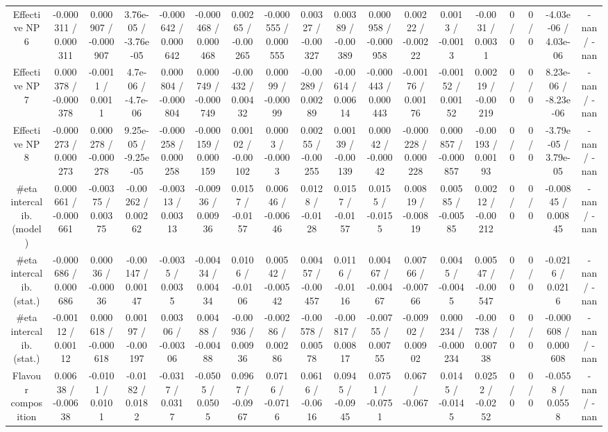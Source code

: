 \documentclass[10pt]{article}
\begin{document}
\begin{table}[htbp]
\begin{center}
\begin{tabular}{|c|c|c|c|c|c|c|c|c|c|c|c|c|c|c|c|c|c|}
  Effective NP 6 & -0.000311 / 0.000311 & 0.000907 / -0.000907 & 3.76e-05 / -3.76e-05 & -0.000642 / 0.000642 & -0.000468 / 0.000468 & 0.00265 / -0.00265 & -0.000555 / 0.000555 & 0.00327 / -0.00327 & 0.00389 / -0.00389 & 0.000958 / -0.000958 & 0.00222 / -0.00222 & 0.0013 / -0.0013 & -0.0031 / 0.0031 & 0 / 0 & 0 / 0 & -4.03e-06 / 4.03e-06 & -nan / -nan \\ 
  Effective NP 7 & 0.000378 / -0.000378 & -0.0011 / 0.0011 & 4.7e-06 / -4.7e-06 & 0.000804 / -0.000804 & 0.000749 / -0.000749 & -0.00432 / 0.00432 & 0.00099 / -0.00099 & -0.00289 / 0.00289 & -0.00614 / 0.00614 & -0.000443 / 0.000443 & -0.00176 / 0.00176 & -0.00152 / 0.00152 & 0.00219 / -0.00219 & 0 / 0 & 0 / 0 & 8.23e-06 / -8.23e-06 & -nan / -nan \\ 
  Effective NP 8 & -0.000273 / 0.000273 & 0.000278 / -0.000278 & 9.25e-05 / -9.25e-05 & -0.000258 / 0.000258 & -0.000159 / 0.000159 & 0.00102 / -0.00102 & 0.0003 / -0.0003 & 0.00255 / -0.00255 & 0.00139 / -0.00139 & 0.00042 / -0.00042 & -0.000228 / 0.000228 & 0.000857 / -0.000857 & -0.00193 / 0.00193 & 0 / 0 & 0 / 0 & -3.79e-05 / 3.79e-05 & -nan / -nan \\ 
  #eta intercalib. (model) & 0.000661 / -0.000661 & -0.00375 / 0.00375 & -0.00262 / 0.00262 & -0.00313 / 0.00313 & -0.00936 / 0.00936 & 0.0157 / -0.0157 & 0.00646 / -0.00646 & 0.0128 / -0.0128 & 0.0157 / -0.0157 & 0.0155 / -0.0155 & 0.00819 / -0.00819 & 0.00585 / -0.00585 & 0.00212 / -0.00212 & 0 / 0 & 0 / 0 & -0.00845 / 0.00845 & -nan / -nan \\ 
  #eta intercalib. (stat.) & -0.000686 / 0.000686 & 0.00036 / -0.00036 & -0.00147 / 0.00147 & -0.0035 / 0.0035 & -0.00434 / 0.00434 & 0.0106 / -0.0106 & 0.00542 / -0.00542 & 0.00457 / -0.00457 & 0.0116 / -0.0116 & 0.00467 / -0.00467 & 0.00766 / -0.00766 & 0.0045 / -0.0045 & 0.00547 / -0.00547 & 0 / 0 & 0 / 0 & -0.0216 / 0.0216 & -nan / -nan \\ 
  #eta intercalib. (stat.) & -0.00112 / 0.00112 & 0.000618 / -0.000618 & 0.00197 / -0.00197 & 0.00306 / -0.00306 & 0.00488 / -0.00488 & -0.00936 / 0.00936 & -0.00286 / 0.00286 & -0.00578 / 0.00578 & -0.00817 / 0.00817 & -0.00755 / 0.00755 & -0.00902 / 0.00902 & 0.000234 / -0.000234 & -0.00738 / 0.00738 & 0 / 0 & 0 / 0 & -0.000608 / 0.000608 & -nan / -nan \\ 
  Flavour composition & 0.00638 / -0.00638 & -0.0101 / 0.0101 & -0.0182 / 0.0182 & -0.0317 / 0.0317 & -0.0505 / 0.0505 & 0.0967 / -0.0967 & 0.0716 / -0.0716 & 0.0616 / -0.0616 & 0.0945 / -0.0945 & 0.0751 / -0.0751 & 0.067 / -0.067 & 0.0145 / -0.0145 & 0.0252 / -0.0252 & 0 / 0 & 0 / 0 & -0.0558 / 0.0558 & -nan / -nan \\ 

\end{tabular}
\end{center}
\end{table}
\end{document}
